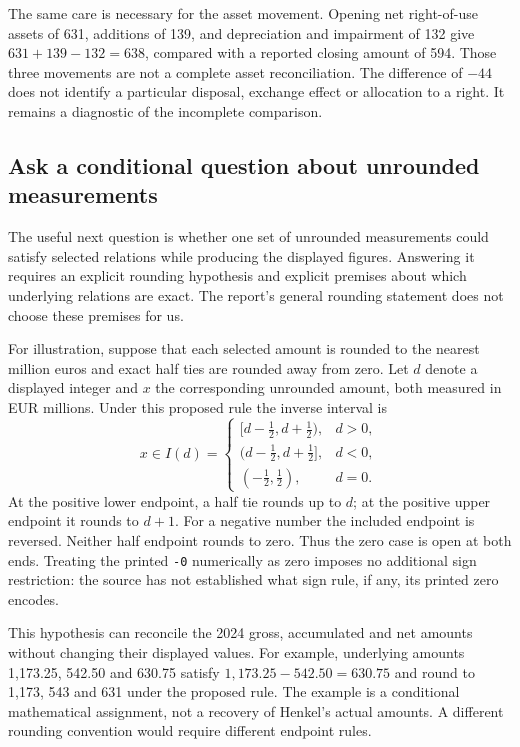 The same care is necessary for the asset movement. Opening net right-of-use
assets of 631, additions of 139, and depreciation and impairment of 132 give
$631+139-132=638$, compared with a reported closing amount of 594. Those three
movements are not a complete asset reconciliation. The difference of $-44$
does not identify a particular disposal, exchange effect or allocation to a
right. It remains a diagnostic of the incomplete comparison.

\subsection{Ask a conditional question about unrounded measurements}

The useful next question is whether one set of unrounded measurements could
satisfy selected relations while producing the displayed figures. Answering
it requires an explicit rounding hypothesis and explicit premises about which
underlying relations are exact. The report's general rounding statement does
not choose these premises for us.

For illustration, suppose that each selected amount is rounded to the nearest
million euros and exact half ties are rounded away from zero. Let $d$ denote
a displayed integer and $x$ the corresponding unrounded amount, both measured
in EUR millions. Under this proposed rule the inverse interval is
\begin{equation}
\label{eq:henkel-proposed-rounding}
 x\in I(d)=
 \begin{cases}
 [d-\tfrac12,d+\tfrac12),&d>0,\\
 (d-\tfrac12,d+\tfrac12],&d<0,\\
 (-\tfrac12,\tfrac12),&d=0.
 \end{cases}
\end{equation}
At the positive lower endpoint, a half tie rounds up to $d$; at the positive
upper endpoint it rounds to $d+1$. For a negative number the included endpoint
is reversed. Neither half endpoint rounds to zero. Thus the zero case is open
at both ends. Treating the printed \texttt{-0} numerically as zero imposes no
additional sign restriction: the source has not established what sign rule,
if any, its printed zero encodes.

This hypothesis can reconcile the 2024 gross, accumulated and net amounts
without changing their displayed values. For example, underlying amounts
1,173.25, 542.50 and 630.75 satisfy
$1{,}173.25-542.50=630.75$ and round to 1,173, 543 and 631 under the proposed
rule. The example is a conditional mathematical assignment, not a recovery
of Henkel's actual amounts. A different rounding convention would require
different endpoint rules.

